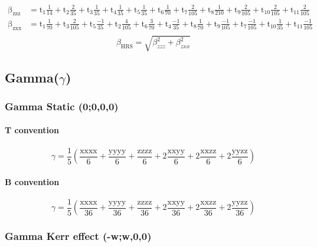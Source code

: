 \documentclass{article}
\begin{document}
\begin{align}
	\mathrm{\beta_{zzz}} &= \mathrm{t_1} \frac{1}{14} + \mathrm{t_2}  \frac{2}{35} + \mathrm{t_3}  \frac{1}{35} + \mathrm{t_4}  \frac{1}{35} + \mathrm{t_5}  \frac{1}{35} + \mathrm{t_6}  \frac{1}{70} + \mathrm{t_7}  \frac{2}{105} + \mathrm{t_8}  \frac{1}{210} + \mathrm{t_9}  \frac{2}{105} + \mathrm{t_{10}}  \frac{2}{105} + \mathrm{t_{11}}  \frac{2}{105}\\
	\mathrm{\beta_{zxx}} &= \mathrm{t_1}  \frac{1}{70} + \mathrm{t_3}  \frac{2}{105} + \mathrm{t_5}  \frac{-1}{35} + \mathrm{t_2}  \frac{4}{105} + \mathrm{t_6}  \frac{3}{70} + \mathrm{t_4}  \frac{-1}{35} + \mathrm{t_8}  \frac{1}{70} + \mathrm{t_9}  \frac{-1}{105} + \mathrm{t_7}  \frac{-1}{105} + \mathrm{t_{10}}  \frac{1}{35} + \mathrm{t_{11}}  \frac{-1}{105}\\
	\end{align}
	\begin{equation}\label{eq:beta_HRS3}
	\beta_{\text{HRS}}= \sqrt{\beta^{2}_{zzz}+\beta^{2}_{zxx}}
	\end{equation}
	\subsection{Gamma($\gamma$)}
	\subsubsection{Gamma Static (0;0,0,0)}
	\paragraph{T convention}
	\begin{equation}\label{eq:gamma_static_T}
	\gamma = \frac{1}{5}\left(\frac{\text{xxxx}}{6} + \frac{\text{yyyy}}{6} + \frac{\text{zzzz}}{6} + 2\frac{\text{xxyy}}{6} + 2\frac{\text{xxzz}}{6} + 2\frac{\text{yyzz}}{6}\right)
	\end{equation}
	\paragraph{B convention}
	\begin{equation}\label{eq:gamma_static_B}
	\gamma = \frac{1}{5}\left(\frac{\text{xxxx}}{36} + \frac{\text{yyyy}}{36} + \frac{\text{zzzz}}{36} + 2\frac{\text{xxyy}}{36} + 2\frac{\text{xxzz}}{36} + 2\frac{\text{yyzz}}{36}\right)
	\end{equation}
	
	\subsubsection{Gamma Kerr effect (-w;w,0,0)}
\end{document}
